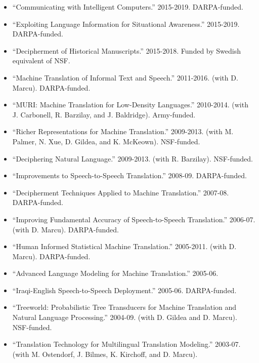 \begin{itemize}
\item ``Communicating with Intelligent Computers.'' 2015-2019.  DARPA-funded.
\item ``Exploiting Language Information for Situational Awareness.''
2015-2019.  DARPA-funded.
\item ``Decipherment of Historical Manuscripts.''  2015-2018.  Funded by Swedish equivalent of NSF.  %
\item ``Machine Translation of Informal Text and Speech.'' 2011-2016. (with D. Marcu). 
DARPA-funded. %
\item ``MURI: Machine Translation for Low-Density Languages.''
2010-2014.  (with J. Carbonell, R. Barzilay, and J. Baldridge).
Army-funded. %
\item ``Richer Representations for Machine Translation.'' 2009-2013.
(with M. Palmer, N. Xue, D. Gildea, and K. McKeown).  NSF-funded.
\item ``Deciphering Natural Language.'' 2009-2013.
(with R. Barzilay).  NSF-funded. %
\item ``Improvements to Speech-to-Speech
Translation.'' 2008-09.  DARPA-funded.
\item ``Decipherment Techniques Applied to Machine
Translation.'' 2007-08.  DARPA-funded. 
\item ``Improving Fundamental Accuracy of Speech-to-Speech 
Translation.'' 2006-07.  (with D. Marcu).  DARPA-funded. 
\item ``Human Informed Statistical Machine Translation.'' 2005-2011. 
(with D. Marcu).  DARPA-funded. 
\item ``Advanced Language Modeling for Machine Translation.''
2005-06.  %
\item ``Iraqi-English Speech-to-Speech Deployment.''
2005-06.  DARPA-funded. 
\item ``Treeworld: Probabilistic Tree Transducers for Machine
Translation and Natural Language Processing.'' 2004-09. 
(with D. Gildea and D. Marcu).  NSF-funded. 
\item ``Translation Technology for Multilingual Translation Modeling.''
2003-07.  (with M. Ostendorf, J. Bilmes, K. Kirchoff, and D. Marcu).

\end{itemize}

